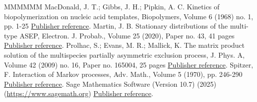 \begin{thebibliography}{MMMMMM}
 MacDonald, J. T.; Gibbs, J. H.; Pipkin, A. C. Kinetics of biopolymerization on nucleic acid templates, Biopolymers, Volume 6 (1968) no. 1, pp. 1-25 \href{https://alco.centre-mersenne.org/articles/10.5802/alco.457/#MGP}{Publisher reference}.
 Martin, J. B. Stationary distributions of the multi-type ASEP, Electron. J. Probab., Volume 25 (2020), Paper no. 43, 41 pages \href{https://alco.centre-mersenne.org/articles/10.5802/alco.457/#Martin20}{Publisher reference}.
 Prolhac, S.; Evans, M. R.; Mallick, K. The matrix product solution of the multispecies partially asymmetric exclusion process, J. Phys. A, Volume 42 (2009) no. 16, Paper no. 165004, 25 pages \href{https://alco.centre-mersenne.org/articles/10.5802/alco.457/#PEM}{Publisher reference}.
 Spitzer, F. Interaction of Markov processes, Adv. Math., Volume 5 (1970), pp. 246-290 \href{https://alco.centre-mersenne.org/articles/10.5802/alco.457/#Sp}{Publisher reference}.
 Sage Mathematics Software (Version 10.7) (2025) (\url{https://www.sagemath.org}) \href{https://alco.centre-mersenne.org/articles/10.5802/alco.457/#sage}{Publisher reference}.
\end{thebibliography}
